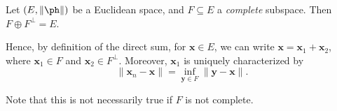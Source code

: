 \documentclass[a4paper]{article}
\begin{document}
\begin{thm}[]
  Let $(E, \|\ph\|)$ be a Euclidean space, and $F\subseteq E$ a \emph{complete} subspace. Then $F \oplus F^\perp = E$.

  Hence, by definition of the direct sum, for $\mathbf{x} \in E$, we can write $\mathbf{x} = \mathbf{x}_1 + \mathbf{x}_2$, where $\mathbf{x}_1 \in F$ and $\mathbf{x}_2 \in F^\perp$. Moreover, $\mathbf{x}_1$ is uniquely characterized by
  \[
    \|\mathbf{x}_n - \mathbf{x}\| = \inf_{\mathbf{y} \in F} \|\mathbf{y\mathbf{}} - \mathbf{x}\|.
  \]
\end{thm}
\begin{center}
\end{center}
Note that this is not necessarily true if $F$ is not complete.
\end{document}
